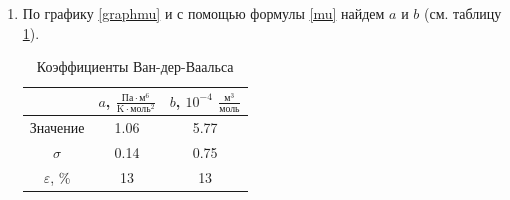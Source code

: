 \documentclass[12pt]{article}
\begin{document}
\begin{enumerate}
        \item По графику \ref{graphmu} и с помощью формулы \ref{mu} найдем $a$ и $b$ 
        (см. таблицу \ref{tabcoeffs}).
        \begin{table}[h]
            \centering
            \begin{tabular}{|c|c|c|}
            \hline
              & $a$, $\frac{\text{Па}\cdot\text{м}^6}{\text{K}\cdot\text{моль}^2}$    & $b$, $10^{-4}$ $\frac{\text{м}^3}{\text{моль}}$    \\ \hline
            Значение & 1.06 & 5.77 \\ \hline
            $\sigma$ & 0.14 & 0.75 \\ \hline
            $\varepsilon$, \% & 13   & 13   \\ \hline
            \end{tabular}
            \caption{Коэффициенты Ван-дер-Ваальса}
            \label{tabcoeffs}
        \end{table}
    \end{enumerate}
\end{document}
